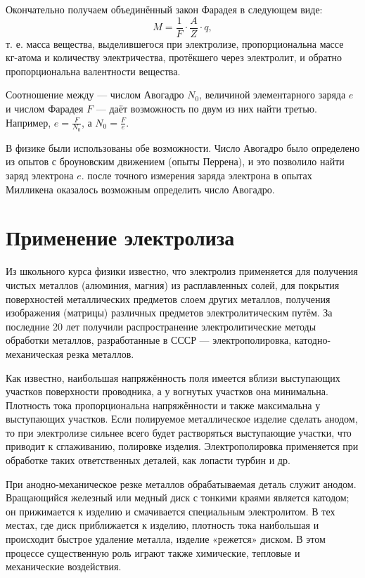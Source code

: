 \documentclass[a4paper,10pt]{book}
\begin{document}
Окончательно получаем объединённый закон Фарадея в следующем виде: \begin{equation}\label{22.5}
M = \frac{1}{F}\cdot\frac{A}{Z}\cdot q,
\end{equation} т. е. масса вещества, выделившегося при электролизе, пропорциональна массе $\textit{кг-атома}$ и количеству электричества, протёкшего через электролит, и обратно пропорциональна валентности вещества.

Соотношение между — числом Авогадро $N_0$, величиной элементарного заряда $e$ и числом Фарадея $F$ — даёт возможность по двум из них найти третью. Например, $e = \frac{F}{N_0}$, а $N_0 = \frac{F}{e}$.

В физике были использованы обе возможности. Число Авогадро было определено из опытов с броуновским движением (опыты Перрена), и это позволило найти заряд электрона $e$. после точного измерения заряда электрона в опытах Милликена оказалось возможным определить число Авогадро.

\section{Применение электролиза}

Из школьного курса физики известно, что электролиз применяется для получения чистых металлов (алюминия, магния) из расплавленных солей, для покрытия поверхностей металлических предметов слоем других металлов, получения изображения (матрицы) различных предметов электролитическим путём. За последние 20 лет получили распространение электролитические методы обработки металлов, разработанные в СССР — электрополировка, катодно-механическая резка металлов.

Как известно, наибольшая напряжённость поля имеется вблизи выступающих участков поверхности проводника, а у вогнутых участков она минимальна. Плотность тока пропорциональна напряжённости и также максимальна у выступающих участков. Если полируемое металлическое изделие сделать анодом, то при электролизе сильнее всего будет растворяться выступающие участки, что приводит к сглаживанию, полировке изделия. Электрополировка применяется при обработке таких ответственных деталей, как лопасти турбин и др.

При анодно-механическое резке металлов обрабатываемая деталь служит анодом. Вращающийся железный или медный диск с тонкими краями является катодом; он прижимается к изделию и смачивается специальным электролитом. В тех местах, где диск приближается к изделию, плотность тока наибольшая и происходит быстрое удаление металла, изделие «режется» диском. В этом процессе существенную роль играют также химические, тепловые и механические воздействия.
\end{document}
